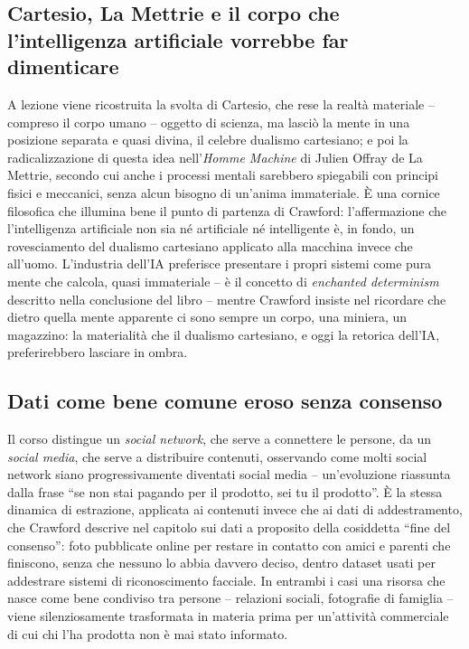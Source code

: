 \documentclass[a4paper,11pt]{article}
\begin{document}
\subsection{Cartesio, La Mettrie e il corpo che l'intelligenza artificiale vorrebbe far dimenticare}

A lezione viene ricostruita la svolta di Cartesio, che rese la realtà materiale -- compreso il corpo umano -- oggetto di scienza, ma lasciò la mente in una posizione separata e quasi divina, il celebre dualismo cartesiano; e poi la radicalizzazione di questa idea nell'\emph{Homme Machine} di Julien Offray de La Mettrie, secondo cui anche i processi mentali sarebbero spiegabili con principi fisici e meccanici, senza alcun bisogno di un'anima immateriale. È una cornice filosofica che illumina bene il punto di partenza di Crawford: l'affermazione che l'intelligenza artificiale non sia né artificiale né intelligente è, in fondo, un rovesciamento del dualismo cartesiano applicato alla macchina invece che all'uomo. L'industria dell'IA preferisce presentare i propri sistemi come pura mente che calcola, quasi immateriale -- è il concetto di \emph{enchanted determinism} descritto nella conclusione del libro -- mentre Crawford insiste nel ricordare che dietro quella mente apparente ci sono sempre un corpo, una miniera, un magazzino: la materialità che il dualismo cartesiano, e oggi la retorica dell'IA, preferirebbero lasciare in ombra.

\subsection{Dati come bene comune eroso senza consenso}

Il corso distingue un \emph{social network}, che serve a connettere le persone, da un \emph{social media}, che serve a distribuire contenuti, osservando come molti social network siano progressivamente diventati social media -- un'evoluzione riassunta dalla frase ``se non stai pagando per il prodotto, sei tu il prodotto''. È la stessa dinamica di estrazione, applicata ai contenuti invece che ai dati di addestramento, che Crawford descrive nel capitolo sui dati a proposito della cosiddetta ``fine del consenso'': foto pubblicate online per restare in contatto con amici e parenti che finiscono, senza che nessuno lo abbia davvero deciso, dentro dataset usati per addestrare sistemi di riconoscimento facciale. In entrambi i casi una risorsa che nasce come bene condiviso tra persone -- relazioni sociali, fotografie di famiglia -- viene silenziosamente trasformata in materia prima per un'attività commerciale di cui chi l'ha prodotta non è mai stato informato.
\end{document}
